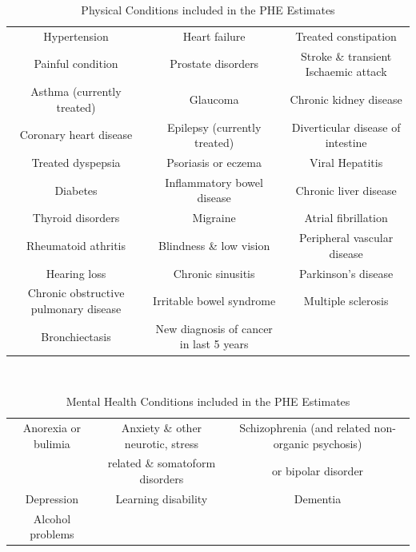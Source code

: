\begin{table}
    \caption{Physical Conditions included in the PHE Estimates}
    \centering
    \begin{tabular}{ccc}
        \toprule
        Hypertension & Heart failure & Treated constipation\\
        Painful condition & Prostate disorders & Stroke \& transient Ischaemic attack\\
        Asthma (currently treated) & Glaucoma & Chronic kidney disease \\
        Coronary heart disease & Epilepsy (currently treated) & Diverticular disease of intestine \\
        Treated dyspepsia & Psoriasis or eczema & Viral Hepatitis \\
        Diabetes & Inflammatory bowel disease & Chronic liver disease \\
        Thyroid disorders & Migraine & Atrial fibrillation \\
        Rheumatoid athritis & Blindness \& low vision & Peripheral vascular disease \\ 
        Hearing loss & Chronic sinusitis & Parkinson's disease \\
        Chronic obstructive pulmonary disease & Irritable bowel syndrome & Multiple sclerosis \\
        Bronchiectasis & New diagnosis of cancer in last 5 years & \ \\
        \bottomrule
    \end{tabular}
    \label{tab:op:phys_conditions}
\end{table}
\begin{table}
    \caption{Mental Health Conditions included in the PHE Estimates}\
    \centering
    \begin{tabular}{ccc}
        \toprule
        Anorexia or bulimia & Anxiety \& other neurotic, stress & Schizophrenia (and related non-organic psychosis) \\
        \ & related \& somatoform disorders & or bipolar disorder \\
        Depression & Learning disability & Dementia \\
        Alcohol problems & \ & \ \\
        \bottomrule
    \end{tabular}
    \label{tab:op:mh_conditions}
\end{table}
  
